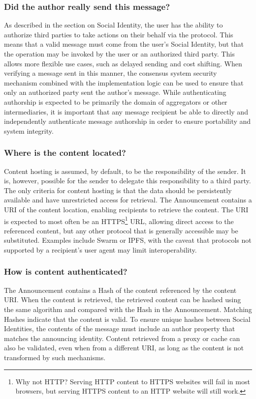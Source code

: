 \documentclass[12pt,letterpaper]{article}
\begin{document}
\subsubsection{Did the author really send this message?}

As described in the section on Social Identity, the user has the ability to authorize third
parties to take actions on their behalf via the protocol. This means that a valid message
must come from the user's Social Identity, but that the operation may be invoked by the user
or an authorized third party. This allows more flexible use cases, such as delayed sending
and cost shifting. When verifying a message sent in this manner, the consensus system
security mechanism combined with the implementation logic can be used to ensure that only an
authorized party sent the author's message. While authenticating authorship is expected to
be primarily the domain of aggregators or other intermediaries, it is important that any
message recipient be able to directly and independently authenticate message authorship in
order to ensure portability and system integrity.

\subsubsection{Where is the content located?}

Content hosting is assumed, by default, to be the responsibility of the sender. It is,
however, possible for the sender to delegate this responsibility to a third party. The only
criteria for content hosting is that the data should be persistently available and have
unrestricted access for retrieval. The Announcement contains a URI of the content location,
enabling recipients to retrieve the content. The URI is expected to most often be an
HTTPS\footnote{Why not HTTP? Serving HTTP content to HTTPS websites will fail in most
  browsers, but serving HTTPS content to an HTTP website will still work.} URL, allowing
direct access to the referenced content, but any other protocol that is generally accessible
may be substituted. Examples include Swarm or IPFS, with the caveat that protocols not
supported by a recipient's user agent may limit interoperability.

\subsubsection{How is content authenticated?}

The Announcement contains a Hash of the content referenced by the content URI. When the
content is retrieved, the retrieved content can be hashed using the same algorithm and
compared with the Hash in the Announcement. Matching Hashes indicate that the content is
valid. To ensure unique hashes between Social Identities, the contents of the message must
include an author property that matches the announcing identity. Content retrieved from a
proxy or cache can also be validated, even when from a different URI, as long as the content
is not transformed by such mechanisms.
\end{document}

